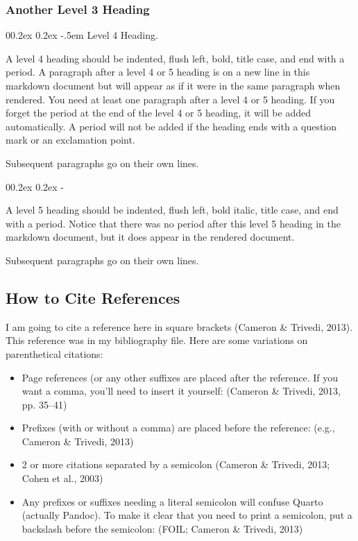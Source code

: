 \documentclass[
  man,
  floatsintext,
  colorlinks=true,linkcolor=blue,citecolor=blue,urlcolor=blue,biblatex]{apa7}
\makeatletter
\renewcommand{\paragraph}{\@startsection{paragraph}{4}{\parindent}%
	{0\baselineskip \@plus 0.2ex \@minus 0.2ex}%
	{-.5em}%
	{\normalfont\normalsize\bfseries\typesectitle}}
\renewcommand{\subparagraph}[1]{\@startsection{subparagraph}{5}{0.5em}%
	{0\baselineskip \@plus 0.2ex \@minus 0.2ex}%
	{-\z@\relax}%
	{\normalfont\normalsize\bfseries\itshape\hspace{\parindent}{#1}\textit{\addperi}}{\relax}}
\makeatother
\begin{document}
\hypertarget{another-level-3-heading}{%
\subsubsection{Another Level 3 Heading}\label{another-level-3-heading}}

\hypertarget{level-4-heading.}{%
\paragraph{Level 4 Heading.}\label{level-4-heading.}}

A level 4 heading should be indented, flush left, bold, title case, and
end with a period. A paragraph after a level 4 or 5 heading is on a new
line in this markdown document but will appear as if it were in the same
paragraph when rendered. You need at least one paragraph after a level 4
or 5 heading. If you forget the period at the end of the level 4 or 5
heading, it will be added automatically. A period will not be added if
the heading ends with a question mark or an exclamation point.

Subsequent paragraphs go on their own lines.

\hypertarget{level-5-heading}{%
\subparagraph{Level 5 Heading.}\label{level-5-heading}}

A level 5 heading should be indented, flush left, bold italic, title
case, and end with a period. Notice that there was no period after this
level 5 heading in the markdown document, but it does appear in the
rendered document.

Subsequent paragraphs go on their own lines.

\hypertarget{how-to-cite-references}{%
\subsection{How to Cite References}\label{how-to-cite-references}}

I am going to cite a reference here in square brackets (Cameron \&
Trivedi, 2013). This reference was in my bibliography file. Here are
some variations on parenthetical citations:

\begin{itemize}
\item
  Page references (or any other suffixes are placed after the reference.
  If you want a comma, you'll need to insert it yourself: (Cameron \&
  Trivedi, 2013, pp. 35--41)
\item
  Prefixes (with or without a comma) are placed before the reference:
  (e.g., Cameron \& Trivedi, 2013)
\item
  2 or more citations separated by a semicolon (Cameron \& Trivedi,
  2013; Cohen et al., 2003)
\item
  Any prefixes or suffixes needing a literal semicolon will confuse
  Quarto (actually Pandoc). To make it clear that you need to print a
  semicolon, put a backslash before the semicolon: (FOIL; Cameron \&
  Trivedi, 2013)
\end{itemize}
\end{document}
